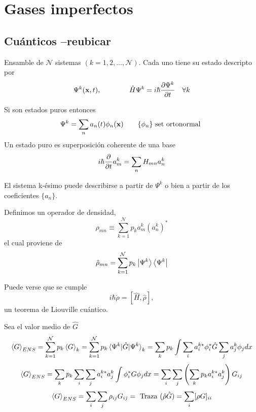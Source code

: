 \documentclass[10pt,oneside]{CBFT_book}
\begin{document}
\chapter{Gases imperfectos}


\section{Cuánticos --reubicar}

Ensamble de $ \mathcal{N} $ sistemas $(k=1,2,...,\mathcal{N})$. Cada uno tiene su estado descripto por 
\[
	\Psi^k(\vb{x},t), \qquad \qquad \hat{H} \Psi^k = i\hbar \dpar{\Psi^k}{t} \quad \forall k
\]

Si son estados puros entonces 
\[
	\Psi^k = \sum_n a_n(t) \phi_n(\vb{x}) \qquad \{ \phi_n \} \text{ set ortonormal }
\]
Un estado puro es superposición coherente de una base 
\[
	i \hbar \frac{\partial^{\hspace{-0.05em}} {}}{\partial {t}^{\hspace{-0.05em}}} a_m^k = \sum_n H_{mn}a_n^k
\]

El sistema k-ésimo puede describirse a partir de $ \Psi^k $ o bien a partir de los coeficientes $ \{ a_n \}$.

Definimos un operador de densidad,
\[
	\rho_{mn} \equiv \sum_{k=1}^\mathcal{N} p_k a_m^k (a_n^k)^*
\]
el cual proviene de 
\[
	\hat{\rho}_{mn} = \sum_{k=1}^\mathcal{N} p_k \Ket{\Psi^k}\Bra{\Psi^k}
\]

Puede verse que se cumple
\[
	i \hbar \dot{\rho} = [ \hat{H}, \hat{\rho} ],  
\]
un teorema de Liouville cuántico.
 
Sea el valor medio de $ \hat{G} $
\[
	\braket{G}_{ENS} = \sum_{k=1}^\mathcal{N} p_k \braket{G}_k = 
	\sum_{k=1}^\mathcal{N} p_k \braket{\Psi^k|\hat{G}|\Psi^k}_k = 
	\sum_k p_k \int \sum_i a_i^{k*}\phi_i^* \hat{G}\sum_j a_j^k\phi_j dx
\]
\[
	\braket{G}_{ENS} = \sum_k p_k \sum_i \sum_j a_i^{k*}  a_j^k \int \phi_i^* G \phi_j dx =
	\sum_i \sum_j \left( \sum_k p_k a_i^{k*}  a_j^k \right) G_{ij}
\]
\[
	\braket{G}_{ENS} = \sum_i \sum_j \rho_{ij} G_{ij} = 
	\text{ Traza }(\hat{\rho}\hat{G}) = \sum_i [\rho G]_{ii}
\]
\end{document}

